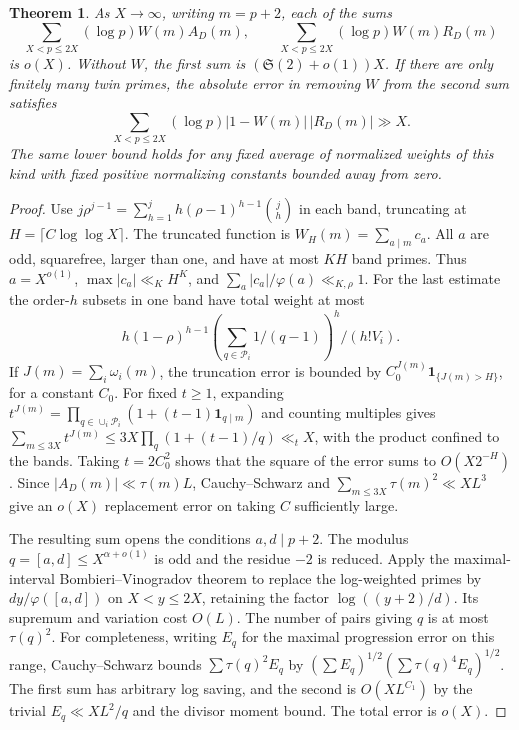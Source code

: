 \documentclass[11pt]{article}
\newtheorem{theorem}{Theorem}
\begin{document}
\begin{theorem}\label{thm:band-cancel}
As \(X\to\infty\), writing \(m=p+2\), each of the sums
\[
 \sum_{X<p\le2X}(\log p)W(m)A_D(m),\qquad
 \sum_{X<p\le2X}(\log p)W(m)R_D(m)
\]
is \(o(X)\). Without \(W\), the first sum is
\((\mathfrak S(2)+o(1))X\).
If there are only finitely many twin primes, the absolute error in
removing \(W\) from the second sum satisfies
\[
 \sum_{X<p\le 2X}(\log p)|1-W(m)|\,|R_D(m)|\gg X .
\]
The same lower bound holds for any fixed average of normalized
weights of this kind with fixed positive normalizing constants
bounded away from zero.
\end{theorem}
\begin{proof}
Use \(j\rho^{j-1}=\sum_{h=1}^j h(\rho-1)^{h-1}\binom{j}{h}\)
in each band, truncating at \(H=\lceil C\log\log X\rceil\).
The truncated function is
\(W_H(m)=\sum_{a\mid m}c_a\). All \(a\) are odd, squarefree,
larger than one, and have at most \(KH\) band primes. Thus
\(a=X^{o(1)}\), \(\max |c_a|\ll_K H^K\), and
\(\sum_a |c_a|/\varphi(a)\ll_{K,\rho}1\).
For the last estimate the order-\(h\) subsets in one band have
total weight at most
\[
 h(1-\rho)^{h-1}\left(\sum_{q\in\mathcal P_i}1/(q-1)\right)^h/(h! V_i).
\]
If \(J(m)=\sum_i\omega_i(m)\), the truncation error is bounded by
\(C_0^{J(m)}\mathbf1_{\{J(m)>H\}}\), for a constant \(C_0\).
For fixed \(t\ge1\), expanding
\(t^{J(m)}=\prod_{q\in\cup_i\mathcal P_i}(1+(t-1)\mathbf1_{q\mid m})\)
and counting multiples gives
\(\sum_{m\le3X}t^{J(m)}\le3X\prod_q(1+(t-1)/q)\ll_t X\),
with the product confined to the bands. Taking \(t=2C_0^2\)
shows that the square of the error sums to \(O(X2^{-H})\).
Since \(|A_D(m)|\ll\tau(m)L\), Cauchy--Schwarz and
\(\sum_{m\le3X}\tau(m)^2\ll X L^3\) give an \(o(X)\) replacement
error on taking \(C\) sufficiently large.

The resulting sum opens the conditions \(a,d\mid p+2\).
The modulus \(q=[a,d]\le X^{\alpha+o(1)}\) is odd and the residue
\(-2\) is reduced. Apply the maximal-interval Bombieri--Vinogradov
theorem \cite{BV} to replace the log-weighted primes by
\(dy/\varphi([a,d])\) on \(X<y\le2X\), retaining the factor
\(\log((y+2)/d)\). Its supremum and variation cost \(O(L)\).
The number of pairs giving \(q\) is at most \(\tau(q)^2\).
For completeness, writing \(E_q\) for the maximal progression
error on this range, Cauchy--Schwarz bounds
\(\sum \tau(q)^2E_q\) by
\((\sum E_q)^{1/2}(\sum\tau(q)^4 E_q)^{1/2}\).
The first sum has arbitrary log saving, and the second is
\(O(X L^{C_1})\) by the trivial \(E_q\ll X L^2/q\) and the
divisor moment bound. The total error is \(o(X)\).


\end{proof}
\end{document}
